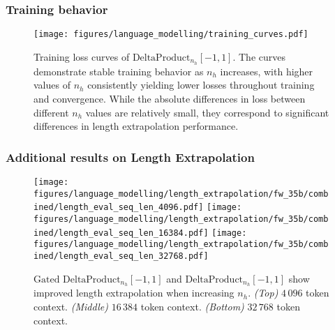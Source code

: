 \documentclass{article} %
\begin{document}
\subsubsection{Training behavior}

\begin{figure}[ht]
    \centering
    \texttt{[image: figures/language\_modelling/training\_curves.pdf]}
    \vspace{-5mm}
    \caption{Training loss curves of $\text{DeltaProduct}_{n_h}[-1,1]$. The curves demonstrate stable training behavior as $n_h$ increases, with higher values of $n_h$ consistently yielding lower losses throughout training and convergence. While the absolute differences in loss between different $n_h$ values are relatively small, they correspond to significant differences in length extrapolation performance.}
\label{fig:training-curves}
\end{figure}

\subsubsection{Additional results on Length Extrapolation}


\begin{figure}[H]
    \centering
    \texttt{[image: figures/language\_modelling/length\_extrapolation/fw\_35b/combined/length\_eval\_seq\_len\_4096.pdf]}
    \texttt{[image: figures/language\_modelling/length\_extrapolation/fw\_35b/combined/length\_eval\_seq\_len\_16384.pdf]}
    \texttt{[image: figures/language\_modelling/length\_extrapolation/fw\_35b/combined/length\_eval\_seq\_len\_32768.pdf]}
    \vspace{-5mm}
    \caption{$\text{Gated DeltaProduct}_{n_h}\left[-1,1\right]$ and $\text{DeltaProduct}_{n_h}\left[-1,1\right]$ show improved length extrapolation when increasing $n_h$. \emph{(Top)} $4\,096$ token context. \emph{(Middle)} $16\,384$ token context. \emph{(Bottom)} $32\,768$ token context.}
\label{fig:combined_length_extrapolation}
\end{figure}
\end{document}
